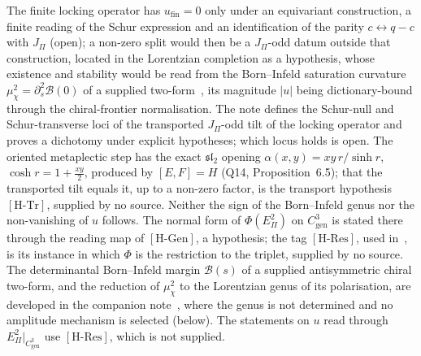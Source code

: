 \documentclass[11pt,a4paper]{article}
\theoremstyle{definition}
\newcommand{\Epi}{E_\Pi}
\newcommand{\Cgen}{C^3_{\mathrm{gen}}}
\newcommand{\HRes}{\ensuremath{[\mathrm{H\text{-}Res}]}}
\newcommand{\HGen}{\ensuremath{[\mathrm{H\text{-}Gen}]}}
\newcommand{\HTr}{\ensuremath{[\mathrm{H\text{-}Tr}]}}
\begin{document}
      The finite locking operator has $u_{\mathrm{fin}}=0$ only under an equivariant construction, a finite reading of
      the Schur expression and an identification of the parity $c\leftrightarrow q-c$ with $J_\Pi$ (open); a non-zero
      split would then be a $J_\Pi$-odd datum outside that construction, located in the Lorentzian completion as a
      hypothesis, whose existence and stability would be read from the Born--Infeld saturation curvature
      $\mu_\chi^2=\partial_s^2\mathcal B(0)$ of a supplied two-form~\cite{Beau2026bim}, its magnitude $|u|$ being
      dictionary-bound through the chiral-frontier normalisation.
      The note defines the Schur-null and Schur-transverse loci of the transported $J_\Pi$-odd tilt of the locking
      operator and proves a dichotomy under explicit hypotheses; which locus holds is open.
      The oriented metaplectic step has the exact $\mathfrak{sl}_2$ opening $\alpha(x,y)=xy\,r/\sinh r$,
      $\cosh r=1+\tfrac{xy}{2}$, produced by $[E,F]=H$ (Q14, Proposition~6.5); that the transported tilt equals it, up
      to a non-zero factor, is the transport hypothesis \HTr{}, supplied by no source.
      Neither the sign of the Born--Infeld genus nor the non-vanishing of $u$ follows.
      The normal form of $\Phi(\Epi^2)$ on $\Cgen$ is stated there through the reading map of \HGen{}, a hypothesis;
      the tag \HRes{}, used in~\cite{Beau2026pyl, Beau2026pyo}, is its instance in which $\Phi$ is the restriction to
      the triplet, supplied by no source.
      The determinantal Born--Infeld margin $\mathcal B(s)$ of a supplied antisymmetric chiral two-form, and the
      reduction of $\mu_\chi^2$ to the Lorentzian genus of its polarisation, are developed in the companion
      note~\cite{Beau2026bim}, where the genus is not determined and no amplitude mechanism is selected (below).
      The statements on $u$ read through $\Epi^2|_{\Cgen}$ use \HRes{}, which is not supplied.
\end{document}
